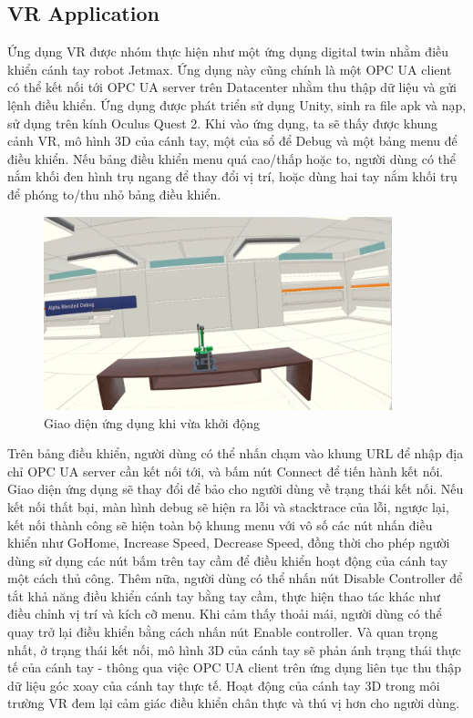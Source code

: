 \subsection{VR Application}

Ứng dụng VR được nhóm thực hiện như một ứng dụng digital twin nhằm điều khiển cánh tay robot Jetmax. Ứng dụng này cũng chính là một OPC UA client có thể kết nối tới OPC UA server trên Datacenter nhằm thu thập dữ liệu và gửi lệnh điều khiển. Ứng dụng được phát triển sử dụng Unity, sinh ra file apk và nạp, sử dụng trên kính Oculus Quest 2. Khi vào ứng dụng, ta sẽ thấy được khung cảnh VR, mô hình 3D của cánh tay, một của sổ để Debug và một bảng menu để điều khiển. Nếu bảng điều khiển menu quá cao/thấp hoặc to, người dùng có thể nắm khối đen hình trụ ngang để thay đổi vị trí, hoặc dùng hai tay nắm khối trụ để phóng to/thu nhỏ bảng điều khiển. 

\begin{figure}[H]
    \centering
    \includegraphics[width=0.9\textwidth]{Images/Result/vr_foreground.jpg}
    \caption{Giao diện ứng dụng khi vừa khởi động}
    \label{fig:vr_foreground}
\end{figure}

Trên bảng điều khiển, người dùng có thể nhấn chạm vào khung URL để nhập địa chỉ OPC UA server cần kết nối tới, và bấm nút Connect để tiến hành kết nối. Giao diện ứng dụng sẽ thay đổi để bảo cho người dùng về trạng thái kết nối. Nếu kết nối thất bại, màn hình debug sẽ hiện ra lỗi và stacktrace của lỗi, ngược lại, kết nối thành công sẽ hiện toàn bộ khung menu với vô số các nút nhấn điều khiển như GoHome, Increase Speed, Decrease Speed, đồng thời cho phép người dùng sử dụng các nút bấm trên tay cầm để điều khiển hoạt động của cánh tay một cách thủ công. Thêm nữa, người dùng có thể nhấn nút Disable Controller để tắt khả năng điều khiển cánh tay bằng tay cầm, thực hiện thao tác khác như điều chỉnh vị trí và kích cỡ menu. Khi cảm thấy thoải mái, người dùng có thể quay trở lại điều khiển bằng cách nhấn nút Enable controller. Và quan trọng nhất, ở trạng thái kết nối, mô hình 3D của cánh tay sẽ phản ánh trạng thái thực tế của cánh tay -  thông qua việc OPC UA client trên ứng dụng liên tục thu thập dữ liệu góc xoay của cánh tay thực tế. Hoạt động của cánh tay 3D trong môi trường VR đem lại cảm giác điều khiển chân thực và thú vị hơn cho người dùng.


